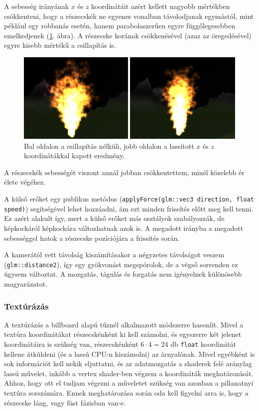 A sebesség irányának $x$ és $z$ koordinátáit azért kellett nagyobb mértékben csökkenteni, hogy a részecskék ne egyenes vonalban távolodjanak egymástól, mint például egy robbanás esetén, hanem parabolaszerűen egyre függőlegesebben emelkedjenek (\ref{fig:parabolicSpeedVector}. ábra). A részecske korának csökkenésével (azaz az öregedésével) egyre kisebb mértékű a csillapítás is.
\begin{figure}[h]
 \centering
 \includegraphics[width=\textwidth]{kepek/parabolicSpeedVector.png}
 \caption{Bal oldalon a csillapítás nélküli, jobb oldalon a lassított $x$ és $z$ koordinátákkal kapott eredmény.}
 \label{fig:parabolicSpeedVector}
\end{figure}
A részecskék sebességét viszont annál jobban csökkentettem, minél közelebb ér élete végéhez. 

A külső erőket egy publikus metódus (\texttt{applyForce(glm::vec3 direction, float speed)}) segítségével lehet hozzáadni, ám ezt minden frissítés előtt meg kell tenni. Ez azért alakult így, mert a külső erőket más osztályok szabályozzák, de képkockáról képkockára változhatnak azok is. A megadott irányba a megadott sebességgel hatok a részecske pozíciójára a frissítés során.

A kamerától vett távolság kiszámításakor a négyzetes távolságot veszem (\texttt{glm::distance2}), így egy gyökvonást megspórolok, de a végső sorrenden ez úgysem változtat. A mozgatás, tágulás és forgatás nem igényelnek különösebb magyarázatot.

\subsubsection{Textúrázás}
A textúrázás a billboard alapú tűznél alkalmazott módszerre hasonlít. Mivel a textúra koordinátákat részecskénként ki kell számolni, és egyszerre két jelenet koordinátáira is szükség van, részecskénként $6 \cdot 4 = 24$ db \texttt{float} koordinátát kellene átküldeni (és a lassú CPU-n kiszámolni) az árnyalónak. Mivel egyébként is sok információt kell nekik eljuttatni, és az adatmozgatás a shaderek felé aránylag lassú művelet, inkább a vertex shader-ben végzem a koordináták meghatározását. Ahhoz, hogy ott el tudjam végezni a műveletet szükség van azonban a pillanatnyi textúra sorszámára. Ennek meghatározása során oda kell figyelni arra is, hogy a részecske láng, vagy füst fázisban van-e.

